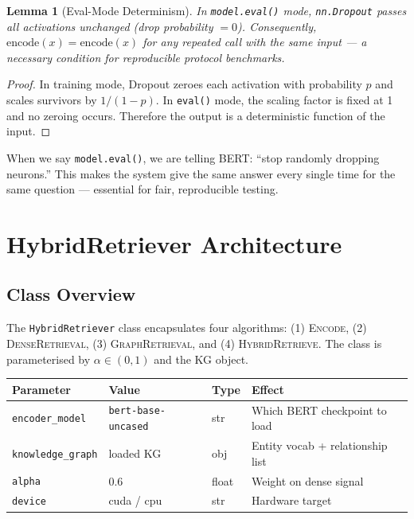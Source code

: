 \documentclass[12pt,a4paper]{article}
\theoremstyle{definition}
\theoremstyle{plain}
\newtheorem{lemma}[theorem]{Lemma}
\theoremstyle{remark}
\begin{document}
\begin{lemma}[Eval-Mode Determinism]
\label{lem:eval}
In \texttt{model.eval()} mode, \texttt{nn.Dropout} passes all
activations unchanged (drop probability $= 0$). Consequently,
$\mathrm{encode}(x) = \mathrm{encode}(x)$ for any repeated call
with the same input --- a necessary condition for reproducible
protocol benchmarks.
\end{lemma}
\begin{proof}
  In training mode, Dropout zeroes each activation with probability $p$
  and scales survivors by $1/(1-p)$.
  In \texttt{eval()} mode, the scaling factor is fixed at 1 and no
  zeroing occurs.  Therefore the output is a deterministic function
  of the input.
\end{proof}

\begin{tcolorbox}[laymanbox]
When we say \texttt{model.eval()}, we are telling BERT: ``stop randomly
dropping neurons.'' This makes the system give the same answer every
single time for the same question --- essential for fair, reproducible
testing.
\end{tcolorbox}

\newpage
\section{HybridRetriever Architecture}

\subsection{Class Overview}

The \texttt{HybridRetriever} class encapsulates four algorithms:
(1) \textsc{Encode}, (2) \textsc{DenseRetrieval},
(3) \textsc{GraphRetrieval}, and (4) \textsc{HybridRetrieve}.
The class is parameterised by $\alpha \in (0,1)$ and the KG object.

\begin{center}
\renewcommand{\arraystretch}{1.3}
\begin{tabular}{llll}
\toprule
\textbf{Parameter} & \textbf{Value} & \textbf{Type} & \textbf{Effect} \\
\midrule
\texttt{encoder\_model} & \texttt{bert-base-uncased} & str &
  Which BERT checkpoint to load \\
\texttt{knowledge\_graph} & loaded KG & obj &
  Entity vocab + relationship list \\
\texttt{alpha} & 0.6 & float &
  Weight on dense signal \\
\texttt{device} & cuda / cpu & str &
  Hardware target \\
\bottomrule
\end{tabular}
\end{center}
\end{document}
